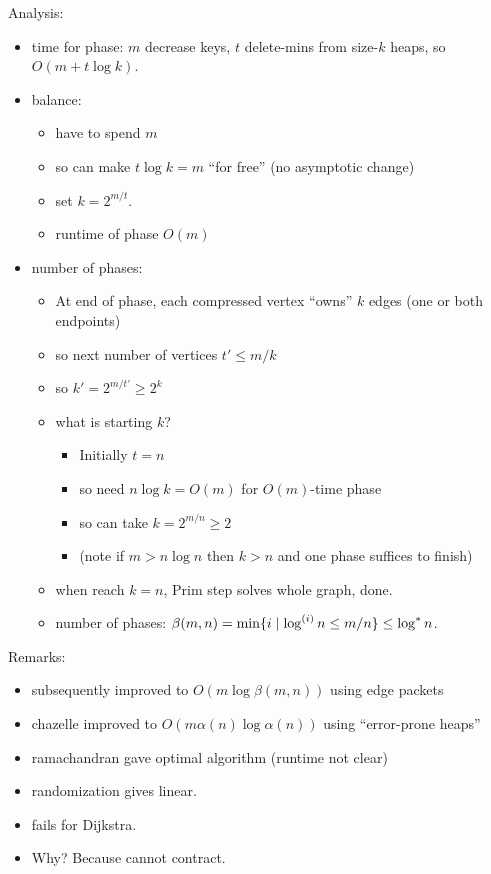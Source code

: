 \documentclass{article}
\begin{document}
Analysis:
\begin{itemize}
\item time for phase: $m$ decrease keys, $t$ delete-mins from size-$k$
  heaps, so $O(m+t\log k)$.
\item balance: 
\begin{itemize}
\item have to spend $m$
\item so can make $t\log k = m$ ``for free'' (no asymptotic change)
\item set $k=2^{m/t}$.
\item runtime of phase $O(m)$
\end{itemize}
\item number of phases:
\begin{itemize}
\item At end of phase, each compressed vertex ``owns'' $k$ edges (one
  or both endpoints)
\item so next number of vertices $t' \le m/k$
\item so $k' = 2^{m/t'} \ge 2^k$
\item what is starting $k$?  
\begin{itemize}
\item Initially $t=n$ 
\item so need $n\log k = O(m)$ for $O(m)$-time phase
\item so can take $k=2^{m/n}\ge 2$
\item (note if $m>n\log n$ then $k>n$ and one phase suffices to finish)
\end{itemize}
\item when reach $k=n$, Prim step solves whole graph, done.
\item number of phases: $\beta(m,n) = \min\{ i \mid \log^{(i)} n \le
    m/n \} \le \log^* n$.
\end{itemize}
\end{itemize}

Remarks: 
\begin{itemize}
\item subsequently improved to $O(m\log\beta(m,n))$ using edge packets
\item chazelle improved to $O(m\alpha(n)\log\alpha(n))$ using
  ``error-prone heaps''
\item ramachandran gave optimal algorithm (runtime not clear)
\item randomization gives linear.
\item fails for Dijkstra.  
\item Why?  Because cannot contract.
\end{itemize}
\end{document}
